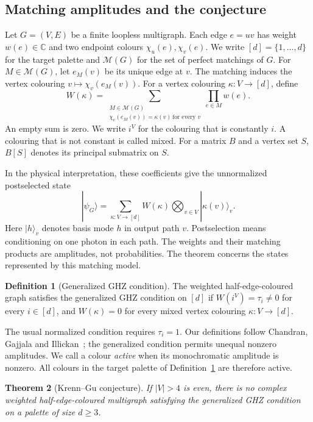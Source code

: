\documentclass[11pt]{article}
\newtheorem{theorem}{Theorem}[section]
\theoremstyle{definition}
\newtheorem{definition}[theorem]{Definition}
\theoremstyle{plain}
\numberwithin{equation}{section}
\begin{document}
\subsection{Matching amplitudes and the conjecture}\label{sec:graphmodel}

Let \(G=(V,E)\) be a finite loopless multigraph. Each edge \(e=uv\) has
weight \(w(e)\in\mathbb C\) and two endpoint colours \(\chi_u(e),\chi_v(e)\).
We write \([d]=\{1,\ldots,d\}\) for the target palette and
\(\mathcal M(G)\) for the set of perfect matchings of \(G\).
For \(M\in\mathcal M(G)\), let \(e_M(v)\) be its unique edge at \(v\).
The matching induces the vertex colouring
\(v\mapsto\chi_v(e_M(v))\). For a vertex colouring \(\kappa:V\to[d]\), define
\[
 W(\kappa)=
 \sum_{\substack{M\in\mathcal M(G)\\
       \chi_v(e_M(v))=\kappa(v)\ \text{for every }v}}
       \prod_{e\in M}w(e).
\]
An empty sum is zero. We write \(i^V\) for the colouring that is constantly
\(i\). A colouring that is not constant is called mixed. For a matrix \(B\)
and a vertex set \(S\), \(B[S]\) denotes its principal submatrix on \(S\).

In the physical interpretation, these coefficients give the unnormalized
postselected state
\[
 |\psi_G\rangle=\sum_{\kappa:V\to[d]}W(\kappa)
                 \bigotimes_{v\in V}|\kappa(v)\rangle_v.
\]
Here \(|h\rangle_v\) denotes basis mode \(h\) in output path \(v\).
Postselection means conditioning on one photon in each path. The weights
and their matching products are amplitudes, not probabilities. The theorem
concerns the states represented by this matching model.

\begin{definition}[Generalized GHZ condition]\label{def:ghz}
The weighted half-edge-coloured graph satisfies the generalized GHZ condition
on \([d]\) if \(W(i^V)=\tau_i\ne0\) for every \(i\in[d]\), and
\(W(\kappa)=0\) for every mixed vertex colouring \(\kappa:V\to[d]\).
\end{definition}

The usual normalized condition requires \(\tau_i=1\). Our definitions follow
Chandran, Gajjala and Illickan~\cite[Sections~1.1 and~1.4]{cgi}; the
generalized condition permits unequal nonzero amplitudes. We call a colour
\emph{active} when its monochromatic amplitude is nonzero. All colours in
the target palette of Definition~\ref{def:ghz} are therefore active.

\begin{theorem}[Krenn--Gu conjecture]\label{thm:graphmain}
If \(|V|>4\) is even, there is no complex weighted half-edge-coloured
multigraph satisfying the generalized GHZ condition on a palette of size
\(d\ge3\).
\end{theorem}
\end{document}

